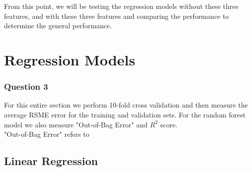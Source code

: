 \documentclass[11pt,letterpaper]{article}
\begin{document}
From this point, we will be testing the regression models without these three 
features, and with these three features and comparing the performance to 
determine the general performance.

\section*{Regression Models}
\subsubsection*{Question 3}
For this entire section we perform 10-fold cross validation and then measure
the average RSME error for the training and validation sets. For the random 
forest model we also measure "Out-of-Bag Error" and $R^2$ score. \\
"Out-of-Bag Error" refers to 
\subsection*{Linear Regression}
\end{document}
